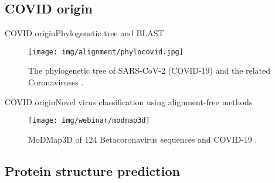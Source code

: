 \documentclass[10pt]{beamer}
\newcommand{\1}{
        	\setbeamertemplate{background}{
        		\texttt{[image: img/1]}
        		\tikz[overlay] \fill[fill opacity=0.75,fill=white] (0,0) rectangle (-\paperwidth,\paperheight);
        	}
}
\begin{document}
\subsection{COVID origin}

\begin{frame}{COVID origin}{Phylogenetic tree and BLAST}
	\begin{figure}[]
		\centering
		\texttt{[image: img/alignment/phylocovid.jpg]}
		\label{img:mot2}
		\caption{The phylogenetic tree of SARS-CoV-2 (COVID-19) and the related Coronaviruses  \cite{tang2020origin}.}
	\end{figure}
\end{frame}

\begin{frame}{COVID origin}{Novel virus classification using alignment-free methods}
	\begin{figure}[]
		\centering
		\texttt{[image: img/webinar/modmap3d]}
		\label{img:mot2}
		\caption{MoDMap3D of 124 Betacoronavirus sequences and COVID-19 \cite{randhawa2020machine}.}
	\end{figure}
\end{frame}


\subsection{Protein structure prediction}
\end{document}
